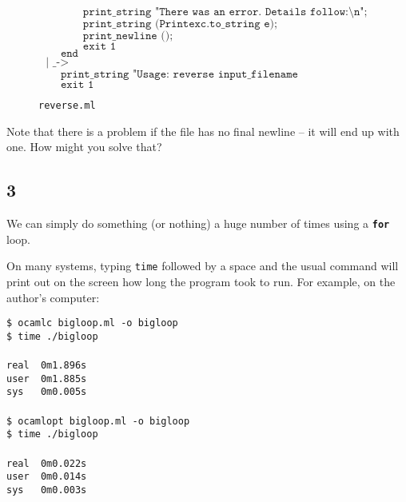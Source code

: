 \documentclass[]{book}
\newcommand{\smspace}{\vspace{4mm}}
\begin{document}
\begin{figure}
\begin{center}
{\begin{minipage}{0.9\textwidth}
$\texttt{~~~~~~~~~~~~print\_string "There was an error.\ Details follow:\textbackslash n";}$\\
$\texttt{~~~~~~~~~~~~print\_string (Printexc.to\_string e);}$\\
$\texttt{~~~~~~~~~~~~print\_newline ();}$\\
$\texttt{~~~~~~~~~~~~exit 1}$\\
$\texttt{~~~~~~end}$\\
$\texttt{~~|~\_ ->}$\\
$\texttt{~~~~~~print\_string "Usage:\ reverse input\_filename output\_filename\textbackslash n";}$\\
$\texttt{~~~~~~exit 1}$\vphantom{g}
\end{minipage}}
\end{center}
\caption{\small\texttt{reverse.ml}}
\label{reverse.ml}
\end{figure}


Note that there is a problem if the file has no final newline -- it will end
up with one. How might you solve that?

\subsection*{3}
We can simply do something (or nothing) a huge number of times using a \textbf{\texttt{for}} loop. 

\smspace
\begin{center}
\end{center}
\smspace

\noindent On many systems, typing \texttt{time} followed by a space and the usual command will print out on the screen how long the program took to run. For example, on the author's computer:

\smspace
\noindent\texttt{\$ ocamlc bigloop.ml -o bigloop}\\
\texttt{\$ time ./bigloop}\\
\\
\texttt{real\ \ 0m1.896s}\\
\texttt{user\ \ 0m1.885s}\\
\texttt{sys\ \ \ 0m0.005s}\\
\\
\texttt{\$ ocamlopt bigloop.ml -o bigloop}\\
\texttt{\$ time ./bigloop}\\
\\
\texttt{real\ \ 0m0.022s}\\
\texttt{user\ \ 0m0.014s}\\
\texttt{sys\ \ \ 0m0.003s}\vphantom{g}
\smspace
\end{document}
